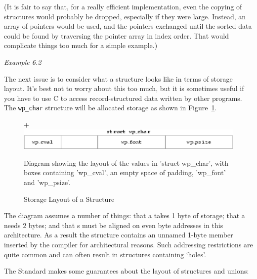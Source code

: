    (It is fair to say that, for a really efficient implementation, even the
    copying of structures would probably be dropped, especially if they were
    large. Instead, an array of pointers would be used, and the pointers
    exchanged until the sorted data could be found by traversing the pointer
    array in index order. That would complicate things too much for a simple
    example.)


   \begin{center}\textit{Example 6.2}\end{center}


   The next issue is to consider what a structure looks like in terms of
    storage layout. It's best not to worry about this too much, but it is
    sometimes useful if you have to use C to access record-structured data
    written by other programs. The \texttt{wp\_char} structure will be
    allocated storage as shown in Figure~\ref{fig:struct}.


    \begin{figure}[htb]+\centering
      \includegraphics[type=pdf,read=.pdf,ext=.pdf,scale=0.95]
      {figure/6.1_struct}
      \caption*{Diagram showing the layout of the values in 'struct wp\_char',
        with boxes containing 'wp\_cval',
        an empty space of padding, 'wp\_font' and 'wp\_psize'.}
      \caption{\label{fig:struct}Storage Layout of a Structure}
   \end{figure}



   The diagram assumes a number of things: that a \kchar{} takes
    1 byte of storage; that a \short{} needs 2 bytes; and that
    \short{}s must be aligned on even byte addresses in this
    architecture. As a result the structure contains an unnamed 1-byte member
    inserted by the compiler for architectural reasons. Such addressing
    restrictions are quite common and can often result in structures containing
    `holes'.


   The Standard makes some guarantees about the layout of structures and
    unions:


